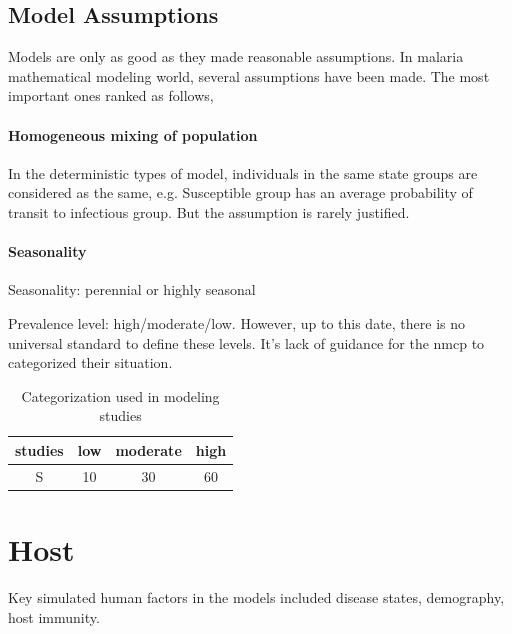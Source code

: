 \documentclass[a4paper, 12pt, twoside]{article}
\begin{document}
\subsection{Model Assumptions}
Models are only as good as they made reasonable assumptions. In malaria mathematical modeling world, several assumptions have been made. The most important ones ranked as follows,

\paragraph{Homogeneous mixing of population}%
\label{par:homogeneous_mixing_of_population}
In the deterministic types of model, individuals in the same state groups are considered as the same, e.g. Susceptible group has an average probability of transit to infectious group. But the assumption is rarely justified.

\paragraph{Seasonality}%
\label{par:seasonality}
Seasonality: perennial or highly seasonal

Prevalence level: high/moderate/low.
However, up to this date, there is no universal standard to define these levels.
It's lack of guidance for the \gls{nmcp} to categorized their situation.

\begin{table}
	\centering
	\begin{tabular}{c S S S}
		\toprule
		studies & {low} & {moderate} & {high} \\
		\midrule
		S       & 10    & 30         & 60     \\
		\bottomrule
	\end{tabular}
	\caption{Categorization used in modeling studies}
\end{table}

\section{Host}%
\label{sec:Host}

Key simulated human factors in the models included disease states, demography, host immunity.
\end{document}

